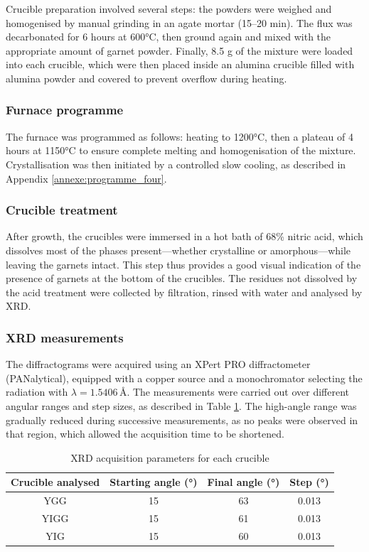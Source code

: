 \documentclass{rapportENSCP}
\begin{document}
Crucible preparation involved several steps: the powders were weighed and homogenised by manual grinding in an agate mortar (15–20 min). The flux was decarbonated for 6 hours at 600°C, then ground again and mixed with the appropriate amount of garnet powder. Finally, 8.5 g of the mixture were loaded into each crucible, which were then placed inside an alumina crucible filled with alumina powder and covered to prevent overflow during heating.

\subsubsection{Furnace programme}

The furnace was programmed as follows: heating to 1200°C, then a plateau of 4 hours at 1150°C to ensure complete melting and homogenisation of the mixture. Crystallisation was then initiated by a controlled slow cooling, as described in Appendix \ref{annexe:programme_four}.

\subsubsection{Crucible treatment}

After growth, the crucibles were immersed in a hot bath of 68\% nitric acid, which dissolves most of the phases present—whether crystalline or amorphous—while leaving the garnets intact. This step thus provides a good visual indication of the presence of garnets at the bottom of the crucibles. The residues not dissolved by the acid treatment were collected by filtration, rinsed with water and analysed by XRD.

\subsubsection{XRD measurements}
The diffractograms were acquired using an XPert PRO diffractometer (PANalytical), equipped with a copper source and a monochromator selecting the radiation with $\lambda = 1.5406$\,\AA. The measurements were carried out over different angular ranges and step sizes, as described in Table \ref{tab:param_drx}. The high-angle range was gradually reduced during successive measurements, as no peaks were observed in that region, which allowed the acquisition time to be shortened.

\begin{table}[h]
    \centering
    \begin{tabular}{|c|c|c|c|}
        \hline
        Crucible analysed & Starting angle (°) & Final angle (°) & Step (°) \\
        \hline
        YGG & 15 & 63 & 0.013 \\
        \hline
        YIGG & 15 & 61 & 0.013 \\
        \hline
        YIG & 15 & 60 & 0.013 \\
        \hline
    \end{tabular}
    \caption{XRD acquisition parameters for each crucible}
    \label{tab:param_drx}
\end{table}
\end{document}
